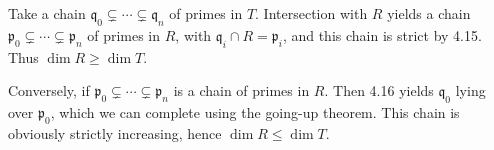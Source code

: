 Take a chain $\mathfrak{q}_0 \subsetneq \cdots \subsetneq \mathfrak{q}_n$ of
primes in $T$. Intersection with $R$ yields a chain
$\mathfrak{p}_0 \subsetneq \cdots \subsetneq \mathfrak{p}_n$ of primes in $R$,
with $\mathfrak{q}_i \cap R = \mathfrak{p}_i$, and this chain
is strict by 4.15. Thus $\dim R\geq \dim T$.

Conversely, if $\mathfrak{p}_0 \subsetneq \cdots \subsetneq \mathfrak{p}_n$ is
a chain of primes in $R$. Then 4.16 yields $\mathfrak{q}_0$ lying over
$\mathfrak{p}_0$, which we can complete using the going-up theorem. This
chain is obviously strictly increasing, hence $\dim R\leq\dim T$.
